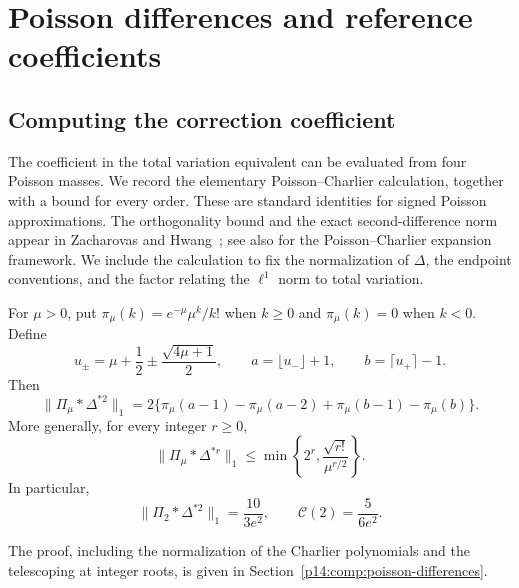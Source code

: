 \section{Poisson differences and reference coefficients}
\label{p2:poisson-calculus}

\subsection{Computing the correction coefficient}
\label{p1:discussion:charlier}

The coefficient in the total variation equivalent can be
evaluated from four Poisson masses.  We record the elementary
Poisson--Charlier calculation, together with a bound for every
order. These are standard identities for signed Poisson
approximations. The orthogonality bound and the exact
second-difference norm appear in Zacharovas and
Hwang~\cite[(2.13), Remark~4.4]{zacharovashwang2010}; see also
\cite{bkn2014} for the Poisson--Charlier expansion framework.
We include the calculation to fix the normalization of
\(\Delta\), the endpoint conventions, and the factor relating
the \(\ell^1\) norm to total variation.

\begin{proposition}
\label{p1:discussion:charlier-norm}
For $\mu>0$, put $\pi_\mu(k)=e^{-\mu}\mu^k/k!$ when $k\ge0$
and $\pi_\mu(k)=0$ when $k<0$.  Define
\[
 u_\pm=\mu+\frac12\pm\frac{\sqrt{4\mu+1}}2,\qquad
 a=\lfloor u_-\rfloor+1,\qquad b=\lceil u_+\rceil-1.
\]
Then
\begin{equation}
 \|\Pi_\mu*\Delta^{*2}\|_1
 =2\bigl\{\pi_\mu(a-1)-\pi_\mu(a-2)
             +\pi_\mu(b-1)-\pi_\mu(b)\bigr\}.
 \label{p1:discussion:finite-norm}
\end{equation}
More generally, for every integer $r\ge0$,
\begin{equation}
 \|\Pi_\mu*\Delta^{*r}\|_1
       \le\min\left\{2^r,\frac{\sqrt{r!}}{\mu^{r/2}}\right\}.
 \label{p1:discussion:general-norm}
\end{equation}
In particular,
\begin{equation}
 \|\Pi_2*\Delta^{*2}\|_1=\frac{10}{3e^2},
 \qquad \mathcal C(2)=\frac{5}{6e^2}.
 \label{p1:discussion:lambda-two}
\end{equation}
\end{proposition}

The proof, including the normalization of the Charlier polynomials and
the telescoping at integer roots, is given in
Section~\ref{p14:comp:poisson-differences}.

